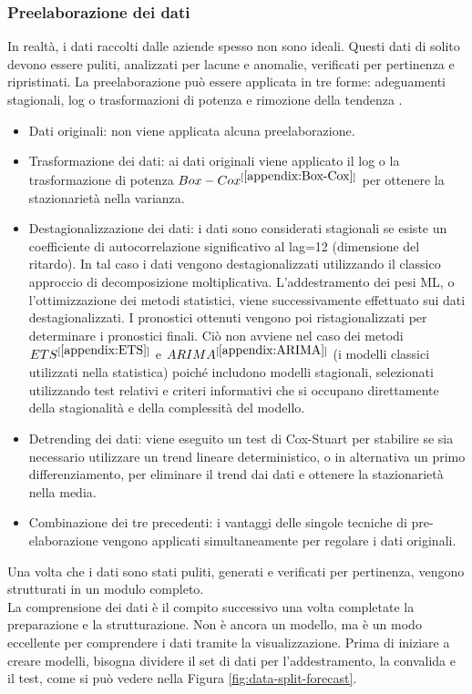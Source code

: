 \documentclass[12pt,a4paper]{report}
\begin{document}
\subsubsection{Preelaborazione dei dati}
In realtà, i dati raccolti dalle aziende spesso non sono ideali. Questi dati di solito devono essere puliti, analizzati per lacune e anomalie, verificati per pertinenza e ripristinati.
La preelaborazione può essere applicata in tre forme: adeguamenti stagionali, log o trasformazioni di potenza e rimozione della tendenza \cite{makridakis2018statistical}.
\begin{itemize}
    \item Dati originali: non viene applicata alcuna preelaborazione.
    \item Trasformazione dei dati: ai dati originali viene applicato il log o la trasformazione di potenza $Box-Cox^{[\ref{appendix:Box-Cox}]}$ per ottenere la stazionarietà nella varianza.
    \item Destagionalizzazione dei dati: i dati sono considerati stagionali se esiste un coefficiente di autocorrelazione significativo al lag=12 (dimensione del ritardo). In tal caso i dati vengono destagionalizzati utilizzando il classico approccio di decomposizione moltiplicativa. L'addestramento dei pesi ML, o l'ottimizzazione dei metodi statistici, viene successivamente effettuato sui dati destagionalizzati. I pronostici ottenuti vengono poi ristagionalizzati per determinare i pronostici finali. Ciò non avviene nel caso dei metodi $ETS^{[\ref{appendix:ETS}]}$ e $ARIMA^{[\ref{appendix:ARIMA}]}$ (i modelli classici utilizzati nella statistica) poiché includono modelli stagionali, selezionati utilizzando test relativi e criteri informativi che si occupano direttamente della stagionalità e della complessità del modello.
    \item Detrending dei dati: viene eseguito un test di Cox-Stuart \cite{cox1955some} per stabilire se sia necessario utilizzare un trend lineare deterministico, o in alternativa un primo differenziamento, per eliminare il trend dai dati e ottenere la stazionarietà nella media.
    \item Combinazione dei tre precedenti: i vantaggi delle singole tecniche di pre-elaborazione vengono applicati simultaneamente per regolare i dati originali.
\end{itemize}

Una volta che i dati sono stati puliti, generati e verificati per pertinenza, vengono strutturati in un modulo completo.\\
La comprensione dei dati è il compito successivo una volta completate la preparazione e la strutturazione. Non è ancora un modello, ma è un modo eccellente per comprendere i dati tramite la visualizzazione. 
Prima di iniziare a creare modelli, bisogna dividere il set di dati per l'addestramento, la convalida e il test, come si può vedere nella Figura \ref{fig:data-split-forecast}.
\end{document}
